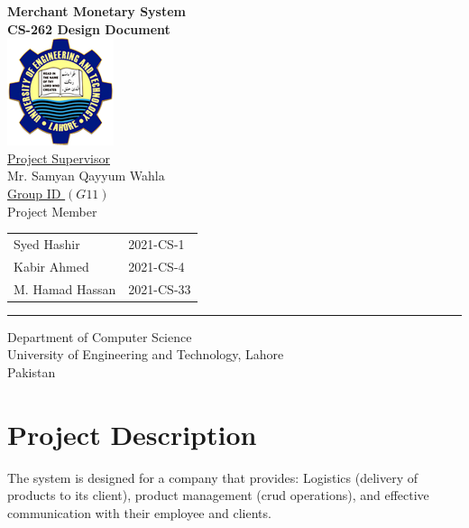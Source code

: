 \documentclass[12pt,a4paper]{report}
\begin{document}
\thispagestyle{empty}
\begin{center}
\textbf{\large{Merchant Monetary System}}\\
\vspace{0.5cm}
\textbf{ CS-262 Design Document} \\
\vspace{1.5cm}
\includegraphics[scale=.07]{UETLogo}\\
\vspace{1.5cm}
\underline{ Project Supervisor}\\
\vspace{0.5cm}
Mr. Samyan Qayyum Wahla\\
\vspace{1cm}
\underline {Group ID $(G 11)$} \\
\vspace{0.5cm}
Project Member\\
\vspace{0.5cm}
\begin{tabular}{ m{5cm} m{4cm}}
 Syed Hashir & 2021-CS-1 \\ 
 Kabir Ahmed & 2021-CS-4  \\  
 M. Hamad Hassan & 2021-CS-33
\end{tabular}
\vspace{2cm}
\par\rule{\textwidth}{0.5pt} 
Department of Computer Science\\
University of Engineering and Technology, Lahore\\
Pakistan
\end{center}
\newpage

\tableofcontents
\thispagestyle{empty}


\newpage
\setcounter{page}{1}
\chapter {Project Description}

The system is designed for a company that provides:
Logistics (delivery of products to its client), product management (crud operations), and effective communication with their employee and clients.
 
\end{document}
